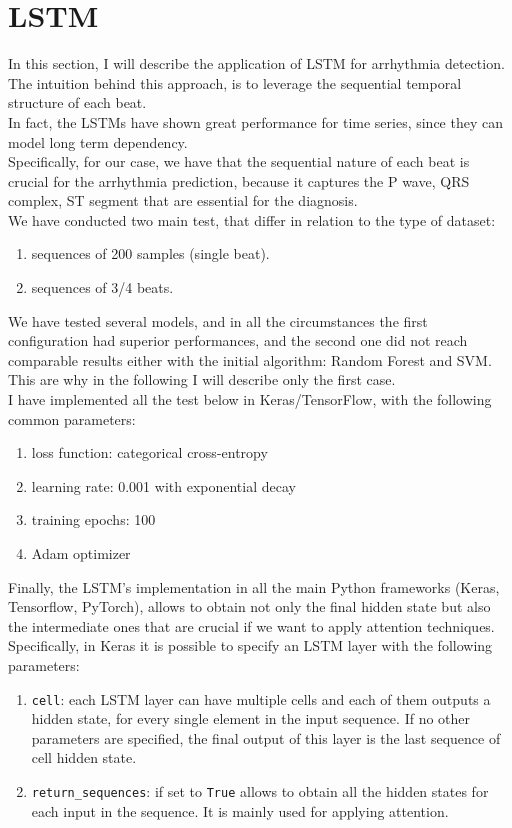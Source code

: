 \documentclass[LaM,binding=0.6cm]{sapthesis}
\begin{document}
\section{LSTM}
In this section, I will describe the application of LSTM for arrhythmia detection. The intuition behind this approach, is to leverage the sequential temporal structure of each beat.\\In fact, the LSTMs have shown great performance for time series, since they can model long term dependency.\\Specifically, for our case, we have that the sequential nature of each beat is crucial for the arrhythmia prediction, because it captures the P wave, QRS complex, ST segment that are essential for the diagnosis.\\We have conducted two main test, that differ in relation to the type of dataset: 
\begin{enumerate}
\item sequences of 200 samples (single beat).
\item sequences of 3/4 beats.
\end{enumerate}
We have tested several models, and in all the circumstances the first configuration had superior performances, and the second one did not reach comparable results either with the initial algorithm: Random Forest and SVM.\\This are why in the following I will describe only the first case.\\I have implemented all the test below in Keras/TensorFlow, with the following common parameters:
\begin{enumerate}
\item loss function: categorical cross-entropy
\item learning rate: 0.001 with exponential decay
\item training epochs: 100
\item Adam optimizer 
\end{enumerate}
Finally, the LSTM's implementation in all the main Python frameworks (Keras, Tensorflow, PyTorch), allows to obtain not only the final hidden state but also the intermediate ones that are crucial if we want to apply attention techniques.\\Specifically, in Keras it is possible to specify an LSTM layer with the following parameters:
\begin{enumerate}
\item \texttt{cell}: each LSTM layer can have multiple cells and each of them outputs a hidden state, for every single element in the input sequence. If no other parameters are specified, the final output of this layer is the last sequence of cell hidden state.
\item \texttt{return\_sequences}: if set to \texttt{True} allows to obtain all the hidden states for each input in the sequence. It is mainly used for applying attention.
\end{enumerate}
\end{document}
